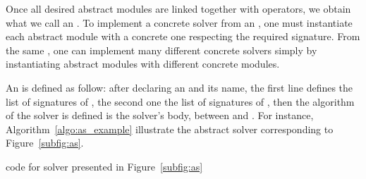 Once all desired abstract modules are linked together with operators, we obtain what we call an \as. To implement a concrete solver from an \as, one must instantiate each abstract module with a concrete one respecting the required signature. From the same \as, one can implement many different concrete solvers simply by instantiating abstract modules with different concrete modules.

An \as{} is defined as follow: after declaring an \mbox{} and its name, the first line defines the list of signatures of \oms, the second one the list of signatures of \opchs, then the algorithm of the solver is defined is the solver's body, between \mbox{} and \mbox{}. For instance, Algorithm~\ref{algo:as_example} illustrate the abstract solver corresponding to Figure~\ref{subfig:as}.


\begin{algorithm}[H]
\dontprintsemicolon
\SetNoline
{}
\caption{\posl{} code for solver presented in Figure~\ref{subfig:as}}\label{algo:as_example}
\end{algorithm}	